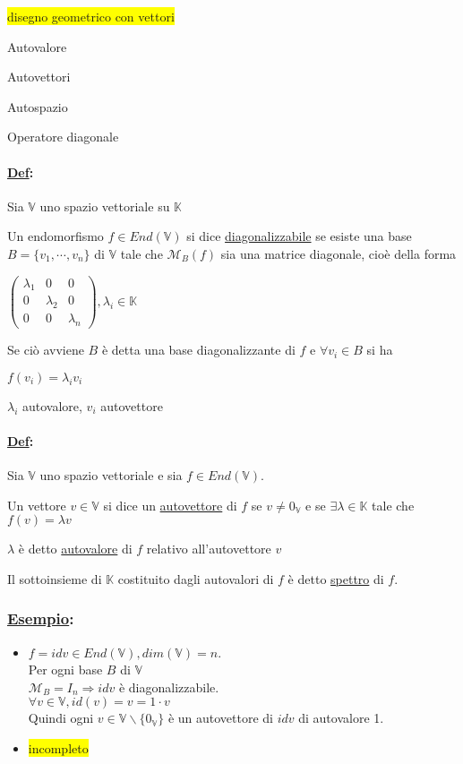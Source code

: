 \documentclass{article}
\newcommand{\hl}[1]{\colorbox{yellow}{#1}}
\newcommand{\ul}[1]{\underline{#1}}
\newcommand{\K}{\mathbb{K}}
\newcommand{\V}{\mathbb{V}}
\newcommand{\M}{\mathcal{M}}
\newcommand{\Def}[2]{\paragraph{\ul{Def}:}#1\\\hspace*{3em}\begin{minipage}{.8\textwidth}#2\end{minipage}}
\newcommand{\Esempio}[1]{\subsubsection*{\ul{Esempio}:}#1}
\begin{document}
\hl{disegno geometrico con vettori}

Autovalore

Autovettori

Autospazio

Operatore diagonale



\Def{Sia $\V$ uno spazio vettoriale su $\K$}{
	Un endomorfismo $f\in End(\V)$ si dice \ul{diagonalizzabile} se esiste una base $B=\{v_1,\cdots,v_n\}$ di $\V$ tale che $\M_B(f)$ sia una matrice diagonale, cioè della forma

	$\begin{pmatrix}
			\lambda_1 & 0         & 0         \\
			0         & \lambda_2 & 0         \\
			0         & 0         & \lambda_n
		\end{pmatrix},\lambda_i\in\K$

	Se ciò avviene $B$ è detta una base diagonalizzante di $f$ e $\forall v_i\in B$ si ha

	$f(v_i)=\lambda_iv_i$

	$\lambda_i$ autovalore, $v_i$ autovettore
}

\Def{Sia $\V$ uno spazio vettoriale e sia $f\in End(\V)$.}{
	Un vettore $v\in\V$ si dice un \ul{autovettore} di $f$ se $v\not=0_\V$ e se $\exists\lambda\in\K$ tale che $f(v)=\lambda v$

	$\lambda$ è detto \ul{autovalore} di $f$ relativo all'autovettore $v$

	Il sottoinsieme di $\K$ costituito dagli autovalori di $f$ è detto \ul{spettro} di $f$.
}

\Esempio{
	\begin{itemize}
		\item $f=idv\in End(\V),dim(\V)=n$.\\
		      Per ogni base $B$ di $\V$\\
		      $\M_B=I_n\Rightarrow idv$ è diagonalizzabile.\\
		      $\forall v\in\V, id(v)=v=1\cdot v$\\
		      Quindi ogni $v\in\V\backslash\{0_\V\}$ è un autovettore di $idv$ di autovalore 1.
		\item \hl{incompleto}
	\end{itemize}
}
\end{document}
